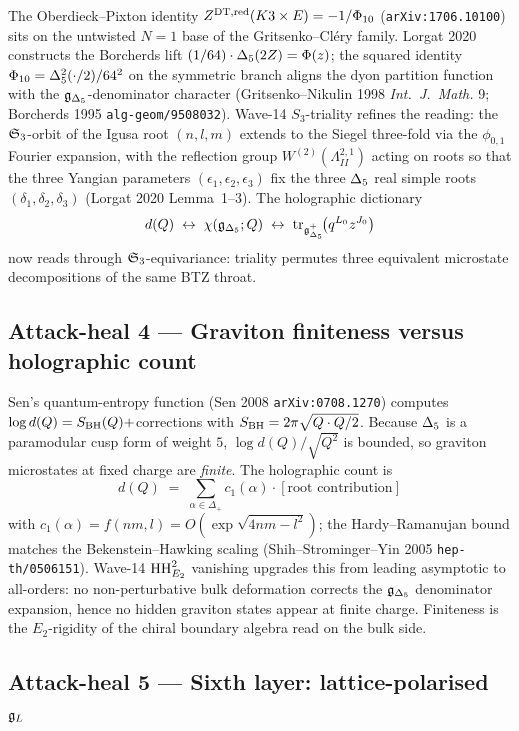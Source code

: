 The Oberdieck--Pixton identity
$Z^{\mathrm{DT,red}}(K3\times E)=-1/\Phi_{10}$
(\texttt{arXiv:1706.10100}) sits on the untwisted
$N=1$ base of the Gritsenko--Cl{\'e}ry family.  Lorgat 2020
constructs the Borcherds lift
$(1/64)\cdot\Delta_{5}(2Z)=\Phi(z)$; the squared identity
$\Phi_{10}=\Delta_{5}^{2}(\cdot/2)/64^{2}$ on the symmetric
branch aligns the dyon partition function with the
$\mathfrak{g}_{\Delta_5}$-denominator character (Gritsenko--Nikulin 1998
\emph{Int.\ J.\ Math.} 9; Borcherds 1995 \texttt{alg-geom/9508032}).
Wave-14 $S_3$-triality refines the reading: the
$\mathfrak{S}_{3}$-orbit of the Igusa root $(n,l,m)$ extends to the Siegel
three-fold via the $\phi_{0,1}$ Fourier expansion, with the
reflection group $W^{(2)}(\Lambda^{2,1}_{II})$ acting on roots so
that the three Yangian parameters
$(\epsilon_1,\epsilon_2,\epsilon_3)$ fix the three $\Delta_{5}$
real simple roots $(\delta_1,\delta_2,\delta_3)$ (Lorgat 2020
Lemma~1--3).  The holographic dictionary
\[
  d(Q)\;\leftrightarrow\;\chi(\mathfrak{g}_{\Delta_5};Q)\;\leftrightarrow\;
  \mathrm{tr}_{\mathfrak{g}_{\Delta_5}^+}\!\bigl(q^{L_0}z^{J_0}\bigr)
\]
now reads through $\mathfrak{S}_{3}$-equivariance: triality permutes three
equivalent microstate decompositions of the same BTZ throat.

\subsection*{Attack-heal 4 --- Graviton finiteness versus holographic count}

Sen's quantum-entropy function (Sen 2008 \texttt{arXiv:0708.1270})
computes $\log d(Q)=S_{\mathrm{BH}}(Q)+$corrections with $S_{\mathrm{BH}}=
2\pi\sqrt{Q\cdot Q/2}$.  Because $\Delta_{5}$ is a paramodular
cusp form of weight $5$, $\log d(Q)/\sqrt{Q^2}$ is bounded,
so graviton microstates at fixed charge are \emph{finite}.  The
holographic count is
\[
  d(Q)\;=\;\sum_{\alpha\in\Delta_+}c_1(\alpha)\cdot[\text{root contribution}]
\]
with $c_1(\alpha)=f(nm,l)=O(\exp\sqrt{4nm-l^{2}})$; the
Hardy--Ramanujan bound matches the Bekenstein--Hawking scaling
(Shih--Strominger--Yin 2005 \texttt{hep-th/0506151}).  Wave-14
$\mathrm{HH}^2_{E_2}$ vanishing upgrades this from leading asymptotic to
all-orders: no non-perturbative bulk deformation corrects the
$\mathfrak{g}_{\Delta_5}$ denominator expansion, hence no hidden graviton states
appear at finite charge.  Finiteness is the $E_2$-rigidity of the
chiral boundary algebra read on the bulk side.

\subsection*{Attack-heal 5 --- Sixth layer: lattice-polarised $\mathfrak{g}_{L}$}

